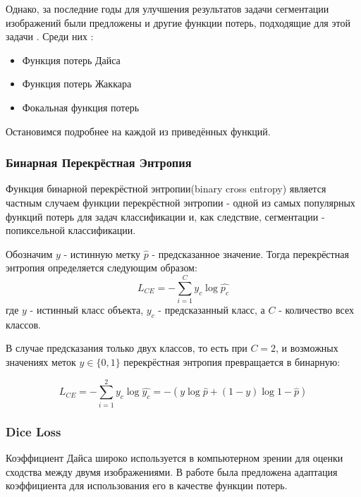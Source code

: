 Однако, за последние годы для улучшения результатов задачи сегментации изображений были предложены и другие функции потерь, подходящие для
этой задачи \cite{Loss-Functions}. Среди них :


\begin{itemize}
    \item Функция потерь Дайса\cite{Dice-Loss}
    \item Функция потерь Жаккара\cite{IoU-Loss}
    \item Фокальная функция потерь \cite{Focal-Loss}
\end{itemize}

Остановимся подробнее на каждой из приведённых функций.

\subsubsection{Бинарная Перекрёстная Энтропия}


Функция бинарной перекрёстной энтропии(binary cross entropy) является частным случаем функции перекрёстной энтропии - одной из самых популярных
функций потерь для задач классификации и, как следствие, сегментации - попиксельной классификации.

Обозначим $y$ - истинную метку $\hat{p}$ - предсказанное значение.
Тогда перекрёстная энтропия \cite{CE} определяется следующим образом:
\begin{equation}
    L_{CE} = -\sum_{i=1}^{C}y_c\log{\hat{p_c}}
\end{equation}
где $y$ - истинный класс объекта, $y_c$ - предсказанный класс, а $C$ - количество
всех классов.

В случае предсказания только двух классов, то есть при $C=2$,
и возможных значениях меток $y \in \{0,1\}$
перекрёстная энтропия превращается в бинарную:

\begin{equation}
    L_{CE} = -\sum_{i=1}^{2}y_c\log{\hat{y_c}} =
    -(y\log{\hat{p}} + (1-y)\log{1-\hat{p}})
\end{equation}

\subsubsection{Dice Loss}

Коэффициент Дайса широко используется в компьютерном зрении для оценки сходства
между двумя изображениями. В работе \cite{Dice} была предложена адаптация коэффициента
для использования его в качестве функции потерь.

